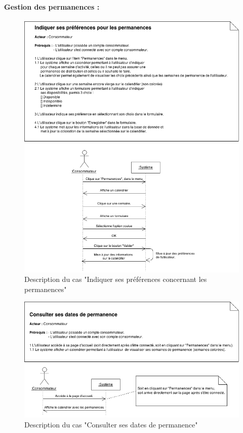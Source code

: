 \documentclass[12pt]{report}
\begin{document}
\paragraph*{Gestion des permanences :}
\begin{figure}[!Hb]
\centering
\includegraphics[width=1.\textwidth]{./ressources/desc_UC_preferences_calendrier.png}
\caption{Description du cas "Indiquer ses préférences concernant les permanences"}
\end{figure}
\clearpage

\begin{figure}[!H]
\centering
\includegraphics[width=1.\textwidth]{./ressources/desc_UC_consulter_permanences.png}
\caption{Description du cas "Consulter ses dates de permanence"}
\end{figure}
\clearpage
\end{document}
